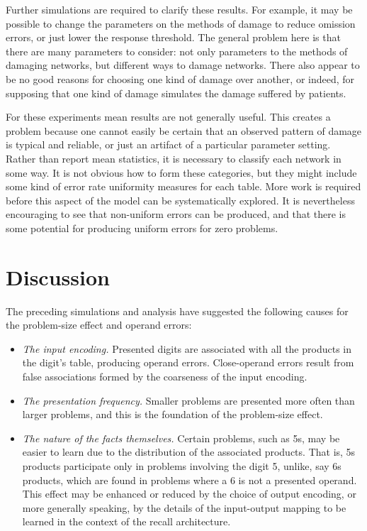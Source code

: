 Further simulations are required to clarify these results.  For example, it
may be possible to change the parameters on the methods of damage to reduce
omission errors, or just lower the response threshold.  The general problem
here is that there are many parameters to consider: not only parameters to
the methods of damaging networks, but different ways to damage networks.
There also appear to be no good reasons for choosing one kind of damage
over another, or indeed, for supposing that one kind of damage simulates
the damage suffered by patients.

For these experiments mean results are not generally useful.  This creates
a problem because one cannot easily be certain that an observed pattern of
damage is typical and reliable, or just an artifact of a
particular parameter setting. Rather than report mean statistics, it is
necessary to classify each network in some way.  It is not obvious how to
form these categories, but they might include some kind of error
rate uniformity measures for each table. More work is required before this
aspect of the model can be systematically explored. It is nevertheless
encouraging to see that non-uniform errors can be produced, and that there
is some potential for producing uniform errors for zero problems.



\section{Discussion}\label{s:xnetdis}

The preceding simulations and analysis have suggested the following causes
for the problem-size effect and operand errors:

\begin{itemize}

\item {\em The
input encoding.}  Presented digits are associated with all the
products in the digit's table, producing operand errors.  Close-operand
errors result from false associations formed by the coarseness of the input
encoding.

\item {\em The presentation frequency.}
Smaller problems are presented more
often than larger problems, and this is the foundation of the problem-size
effect.

\item {\em The
nature of the facts themselves.} Certain problems, such as 5s, may
be easier to learn due to the distribution of the associated products. That
is, 5s products
participate only in problems involving the digit 5, unlike,
say 6s products, which are found in problems where a 6 is not a presented
operand. This effect may be enhanced or reduced by the choice of output
encoding, or more generally speaking, by the details of the input-output
mapping to be learned in the context of the recall architecture.

\end{itemize}


